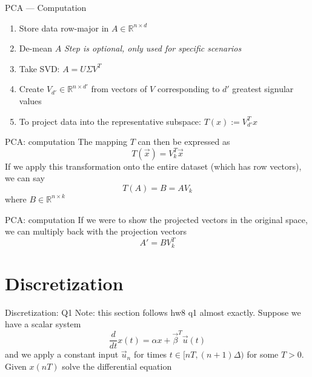 \documentclass{beamer}
\begin{document}
\begin{frame}{PCA --- Computation}
\begin{enumerate}[<+->]
\item Store data row-major in $A \in \mathbb{R}^{n \times d}$
\item De-mean $A$ \hfill \textit{Step is optional, only used for specific scenarios}
\item Take SVD: $A = U \Sigma V^T$
\item Create $V_{d'} \in \mathbb{R}^{n \times d'}$ from vectors of $V$ corresponding to $d'$ greatest signular values
\item To project data into the representative subspace: $T(x) := V_{d'}^T x$
\end{enumerate}
\end{frame}

\begin{frame}{PCA: computation}
The mapping $T$ can then be expressed as
\[ T(\vec{x}) = V_k^T \vec{x} \]
If we apply this transformation onto the entire dataset (which has row vectors), we can say
\[ T(A) = B = A V_k \]
where $B \in \mathbb{R}^{n \times k}$
\end{frame}
\begin{frame}{PCA: computation}
If we were to show the projected vectors in the original space, we can multiply back with the projection vectors
\[ A' = B V_k^T \]
\end{frame}

\section{Discretization}

\begin{frame}{Discretization: Q1}
Note: this section follows hw8 q1 almost exactly. Suppose we have a scalar system
\[ \frac{d}{dt} x(t) = \alpha x + \vec{\beta}^T \vec u(t) \]
and we apply a constant input $\vec{u}_n$ for times $t \in [nT, (n + 1) \Delta)$ for some $T > 0$. Given $x(nT)$ solve the differential equation
\end{frame}
\end{document}
